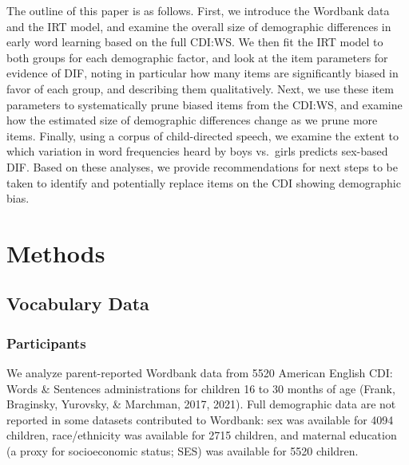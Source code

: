 \documentclass[10pt, letterpaper]{article}
\begin{document}
The outline of this paper is as follows. First, we introduce the
Wordbank data and the IRT model, and examine the overall size of
demographic differences in early word learning based on the full CDI:WS.
We then fit the IRT model to both groups for each demographic factor,
and look at the item parameters for evidence of DIF, noting in
particular how many items are significantly biased in favor of each
group, and describing them qualitatively. Next, we use these item
parameters to systematically prune biased items from the CDI:WS, and
examine how the estimated size of demographic differences change as we
prune more items. Finally, using a corpus of child-directed speech, we
examine the extent to which variation in word frequencies heard by boys
vs.~girls predicts sex-based DIF. Based on these analyses, we provide
recommendations for next steps to be taken to identify and potentially
replace items on the CDI showing demographic bias.

\hypertarget{methods}{%
\section{Methods}\label{methods}}

\hypertarget{vocabulary-data}{%
\subsection{Vocabulary Data}\label{vocabulary-data}}

\hypertarget{participants}{%
\subsubsection{Participants}\label{participants}}

We analyze parent-reported Wordbank data from 5520 American English CDI:
Words \& Sentences administrations for children 16 to 30 months of age
(Frank, Braginsky, Yurovsky, \& Marchman, 2017, 2021). Full demographic
data are not reported in some datasets contributed to Wordbank: sex was
available for 4094 children, race/ethnicity was available for 2715
children, and maternal education (a proxy for socioeconomic status; SES)
was available for 5520 children.
\end{document}
